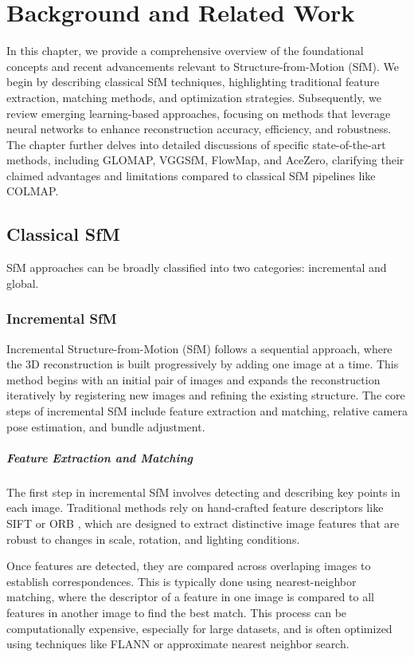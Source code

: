 \chapter{Background and Related Work}\label{chap:related_work}

In this chapter, we provide a comprehensive overview of the foundational concepts and recent advancements relevant to Structure-from-Motion (SfM).
We begin by describing classical SfM techniques, highlighting traditional feature extraction, matching methods, and optimization strategies. 
Subsequently, we review emerging learning-based approaches, focusing on methods that leverage neural networks to enhance reconstruction accuracy, efficiency, and robustness. 
The chapter further delves into detailed discussions of specific state-of-the-art methods, including GLOMAP, VGGSfM, FlowMap, and AceZero, 
clarifying their claimed advantages and limitations compared to classical SfM pipelines like COLMAP.

\section{Classical SfM}
SfM approaches can be broadly classified into two categories: incremental and global.

\subsection{Incremental SfM}
Incremental Structure-from-Motion (SfM) follows a sequential approach, where the 3D reconstruction is built progressively by adding one image at a time. 
This method begins with an initial pair of images and expands the reconstruction iteratively by registering new images and refining the existing structure. 
The core steps of incremental SfM include feature extraction and matching, relative camera pose estimation, and bundle adjustment.

\paragraph{Feature Extraction and Matching}
The first step in incremental SfM involves detecting and describing key points in each image. 
Traditional methods rely on hand-crafted feature descriptors like SIFT \cite{Lowe2004DistinctiveIF} or ORB \cite{rublee2011orb}, 
which are designed to extract distinctive image features that are robust to changes in scale, rotation, and lighting conditions.

Once features are detected, they are compared across overlaping images to establish correspondences.
This is typically done using nearest-neighbor matching, where the descriptor of a feature in one image is compared to all features in another image to find the best match.
This process can be computationally expensive, especially for large datasets, and is often optimized using techniques like FLANN \cite{muja2009fast} or approximate nearest neighbor search.

